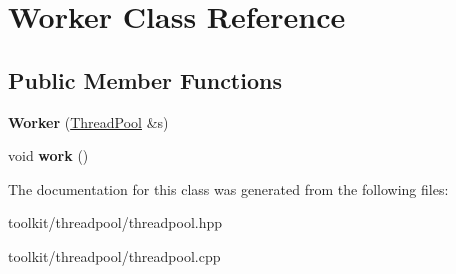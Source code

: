 \hypertarget{classWorker}{
\section{Worker Class Reference}
\label{classWorker}
}
\subsection*{Public Member Functions}
\begin{DoxyCompactItemize}
\item 
\hypertarget{classWorker_aa7a2d1466d9daf7555f108a9a16d29ec}{
{\bfseries Worker} (\hyperlink{classThreadPool}{ThreadPool} \&s)}
\label{classWorker_aa7a2d1466d9daf7555f108a9a16d29ec}

\item 
\hypertarget{classWorker_a296bc6b6cea5648d891561a01d2c3f98}{
void {\bfseries work} ()}
\label{classWorker_a296bc6b6cea5648d891561a01d2c3f98}

\end{DoxyCompactItemize}


The documentation for this class was generated from the following files:\begin{DoxyCompactItemize}
\item 
toolkit/threadpool/threadpool.hpp\item 
toolkit/threadpool/threadpool.cpp\end{DoxyCompactItemize}
